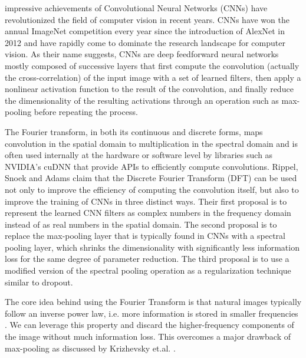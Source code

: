 \documentclass[10pt,journal,compsoc]{IEEEtran}
\begin{document}
%
%
%
%
 impressive achievements of Convolutional Neural Networks (CNNs) have revolutionized the field of computer vision in recent years. CNNs have won the annual ImageNet competition every year since the introduction of AlexNet \cite{alexnet} in 2012 and have rapidly come to dominate the research landscape for computer vision. As their name suggests, CNNs are deep feedforward neural networks mostly composed of successive layers that first compute the convolution (actually the cross-correlation) of the input image with a set of learned filters, then apply a nonlinear activation function to the result of the convolution, and finally reduce the dimensionality of the resulting activations through an operation such as max-pooling before repeating the process.

The Fourier transform, in both its continuous and discrete forms, maps convolution in the spatial domain to multiplication in the spectral domain and is often used internally at the hardware or software level by libraries such as NVIDIA's cuDNN that provide APIs to efficiently compute convolutions. Rippel, Snoek and Adams claim that the Discrete Fourier Transform (DFT) can be used not only to improve the efficiency of computing the convolution itself, but also to improve the training of CNNs in three distinct ways. Their first proposal is to represent the learned CNN filters as complex numbers in the frequency domain instead of as real numbers in the spatial domain. The second proposal is to replace the max-pooling layer that is typically found in CNNs with a spectral pooling layer, which shrinks the dimensionality with significantly less information loss for the same degree of parameter reduction. The third proposal is to use a modified version
of the spectral pooling operation as a regularization technique similar to dropout.

The core idea behind using the Fourier Transform is that natural images typically follow an inverse power law, i.e. more information is stored in smaller frequencies \cite{inverse_law}. We can leverage this property and discard the higher-frequency components of the image without much information loss. This overcomes a major drawback of max-pooling as discussed by Krizhevsky et.al. \cite{alexnet}.
\end{document}
